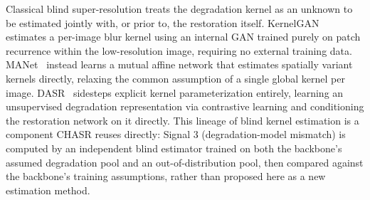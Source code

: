 \documentclass[review]{elsarticle}
\begin{document}
Classical blind super-resolution treats the degradation kernel as an unknown to be estimated jointly with, or prior to, the restoration itself. KernelGAN~\citep{bell2019kernelgan} estimates a per-image blur kernel using an internal GAN trained purely on patch recurrence within the low-resolution image, requiring no external training data. MANet~\citep{liang2021manet} instead learns a mutual affine network that estimates spatially variant kernels directly, relaxing the common assumption of a single global kernel per image. DASR~\citep{wang2021dasr} sidesteps explicit kernel parameterization entirely, learning an unsupervised degradation representation via contrastive learning and conditioning the restoration network on it directly. This lineage of blind kernel estimation is a component CHASR reuses directly: Signal 3 (degradation-model mismatch) is computed by an independent blind estimator trained on both the backbone's assumed degradation pool and an out-of-distribution pool, then compared against the backbone's training assumptions, rather than proposed here as a new estimation method.
\end{document}
